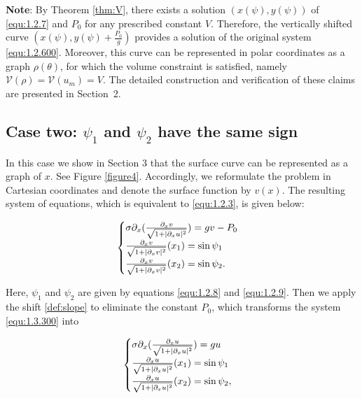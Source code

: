 \documentclass[letterpaper,reqno,10pt,twoside]{amsart}
\theoremstyle{definition}
\theoremstyle{remark}
\begin{document}
    \textbf{Note}: By Theorem \ref{thm:V}, there exists a solution $(x(\psi),y(\psi))$ of \eqref{equ:1.2.7} and $P_{0}$ for any prescribed constant 
    $V$. Therefore, the vertically shifted curve $(x(\psi),y(\psi)+\frac{P_{0}}{g})$ provides a solution of the original system \eqref{equ:1.2.600}. Moreover, this curve can be represented in polar coordinates as a graph $\rho(\theta)$, for which the volume constraint is satisfied, namely $\mathcal{V}(\rho)=\mathscr{V}(u_{m})=V$. The detailed construction and verification of these claims are presented in Section~2.
    
   \subsection{Case two: $\psi_1$ and $\psi_2$ have the same sign} 

    In this case we show in Section 3 that the surface curve can be represented as a graph of $x$. See Figure \ref{figure4}. Accordingly, we reformulate the problem in Cartesian coordinates and denote the surface function by $v(x)$. The resulting system of equations, which is equivalent to \eqref{equ:1.2.3}, is given below:

    \begin{equation}{\label{equ:1.3.300}}
        \begin{cases}
        \sigma\partial_{x}(\frac{\partial_{x}v}{\sqrt{1+\vert \partial_{x}u\vert^{2}}})=gv-P_{0}\\
        \frac{\partial_{x}v}{\sqrt{1+\vert \partial_{x}v\vert^{2}}}(x_1)=\sin\psi_1\\
         \frac{\partial_{x}v}{\sqrt{1+\vert \partial_{x}v\vert^{2}}}(x_2)=\sin\psi_2.
        \end{cases} 
    \end{equation}

     \noindent Here, $\psi_1$ and $\psi_2$ are given by equations \eqref{equ:1.2.8} and \eqref{equ:1.2.9}. Then we apply the shift \eqref{def:slope} to eliminate the constant $P_{0}$, which transforms the system \eqref{equ:1.3.300} into

\begin{equation}{\label{equ:1.3.3}}
        \begin{cases}
        \sigma\partial_{x}(\frac{\partial_{x}u}{\sqrt{1+\vert \partial_{x}u\vert^{2}}})=gu\\
        \frac{\partial_{x}u}{\sqrt{1+\vert \partial_{x}u\vert^{2}}}(x_1)=\sin\psi_1\\
         \frac{\partial_{x}u}{\sqrt{1+\vert \partial_{x}u\vert^{2}}}(x_2)=\sin\psi_2,
        \end{cases} 
    \end{equation}
\end{document}
